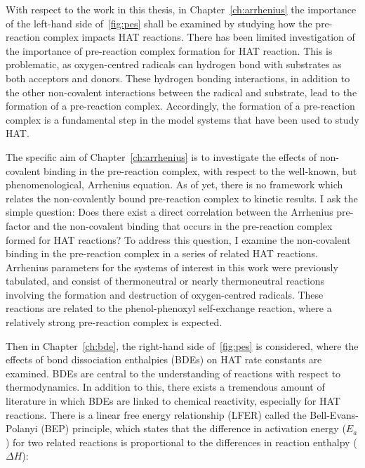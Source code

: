 With respect to the work in this thesis, in Chapter~\ref{ch:arrhenius} the
importance of the left-hand side of~\ref{fig:pes} shall be examined by studying
how the pre-reaction complex impacts HAT reactions. There has been limited
investigation of the importance of pre-reaction complex formation for HAT
reaction.\cite{Kreilick1966} This is problematic, as oxygen-centred radicals can
hydrogen bond with substrates as both acceptors and donors.\cite{Johnson2009a}
These hydrogen bonding interactions, in addition to the other non-covalent
interactions between the radical and substrate, lead to the formation of a
pre-reaction complex. Accordingly, the formation of a pre-reaction complex is a
fundamental step in the model systems that have been used to study HAT.

The specific aim of Chapter~\ref{ch:arrhenius} is to investigate the effects of
non-covalent binding in the pre-reaction complex, with respect to the
well-known, but phenomenological, Arrhenius equation. As of yet, there is no
framework which relates the non-covalently bound pre-reaction complex to kinetic
results. I ask the simple question: Does there exist a direct correlation
between the Arrhenius pre-factor and the non-covalent binding that occurs in the
pre-reaction complex formed for HAT reactions? To address this question, I
examine the non-covalent binding in the pre-reaction complex in a series of
related HAT reactions. Arrhenius parameters for the systems of interest in this
work were previously tabulated,\cite{DiLabio2005} and consist of thermoneutral
or nearly thermoneutral reactions involving the formation and destruction of
oxygen-centred radicals. These reactions are related to the phenol-phenoxyl
self-exchange reaction, where a relatively strong pre-reaction complex is
expected.

Then in Chapter~\ref{ch:bde}, the right-hand side of~\ref{fig:pes} is
considered, where the effects of bond dissociation enthalpies (BDEs) on HAT rate
constants are examined. BDEs are central to the understanding of reactions with
respect to thermodynamics. In addition to this, there exists a tremendous amount
of literature in which BDEs are linked to chemical reactivity, especially for
HAT reactions.\cite{Kochi1973, Tedder1982, Wijtmans2003, Pratt2004, Mayer2004}
There is a linear free energy relationship (LFER) called the Bell-Evans-Polanyi
(BEP) principle,\cite{Bell1936,Evans1938} which states that the difference in
activation energy ($E_a$) for two related reactions is proportional to the
differences in reaction enthalpy ($\Delta H$):

